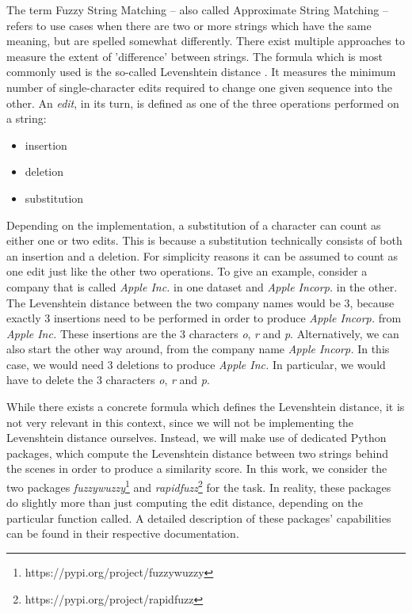 The term Fuzzy String Matching \cite{fuzzy-1, fuzzy-2} -- also called Approximate String Matching -- refers to use cases when there are two or more strings which have the same meaning, but are spelled somewhat differently. There exist multiple approaches to measure the extent of 'difference' between strings. The formula which is most commonly used is the so-called Levenshtein distance \cite{levenshtein}. It measures the minimum number of single-character edits required to change one given sequence into the other. An \textit{edit}, in its turn, is defined as one of the three operations performed on a string: 
\begin{itemize}
	\item insertion
	\item deletion
	\item substitution
\end{itemize}
Depending on the implementation, a substitution of a character can count as either one or two edits. This is because a substitution technically consists of both an insertion and a deletion. For simplicity reasons it can be assumed to count as one edit just like the other two operations. To give an example, consider a company that is called \textit{Apple Inc.} in one dataset and \textit{Apple Incorp.} in the other. The Levenshtein distance between the two company names would be 3, because exactly 3 insertions need to be performed in order to produce \textit{Apple Incorp.} from \textit{Apple Inc.} These insertions are the 3 characters \textit{o}, \textit{r} and \textit{p}. Alternatively, we can also start the other way around, from the company name \textit{Apple Incorp.} In this case, we would need 3 deletions to produce \textit{Apple Inc.} In particular, we would have to delete the 3 characters \textit{o}, \textit{r} and \textit{p}. 

While there exists a concrete formula which defines the Levenshtein distance, it is not very relevant in this context, since we will not be implementing the Levenshtein distance ourselves. Instead, we will make use of dedicated Python packages, which compute the Levenshtein distance between two strings behind the scenes in order to produce a similarity score. In this work, we consider the two packages \textit{fuzzywuzzy}\footnote{https://pypi.org/project/fuzzywuzzy} and \textit{rapidfuzz}\footnote{https://pypi.org/project/rapidfuzz} for the task. In reality, these packages do slightly more than just computing the edit distance, depending on the particular function called. A detailed description of these packages' capabilities can be found in their respective documentation. 

